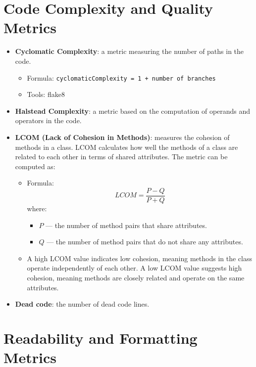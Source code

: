 \documentclass{article}
\begin{document}
\section{Code Complexity and Quality Metrics}

\begin{itemize}
    \item \textbf{Cyclomatic Complexity}: a metric measuring the number of paths in the code. 
    \begin{itemize}
        \item Formula: \texttt{cyclomaticComplexity = 1 + number of branches}
        \item Tools: flake8
    \end{itemize}
    \item \textbf{Halstead Complexity}: a metric based on the computation of operands and operators in the code.
    \item \textbf{LCOM (Lack of Cohesion in Methods)}: measures the cohesion of methods in a class. LCOM calculates how well the methods of a class are related to each other in terms of shared attributes. The metric can be computed as:
    \begin{itemize}
        \item Formula: 
        \[
        LCOM = \frac{P - Q}{P + Q}
        \]
        where:
        \begin{itemize}
            \item \( P \) — the number of method pairs that share attributes.
            \item \( Q \) — the number of method pairs that do not share any attributes.
        \end{itemize}
        \item A high LCOM value indicates low cohesion, meaning methods in the class operate independently of each other. A low LCOM value suggests high cohesion, meaning methods are closely related and operate on the same attributes.
    \end{itemize}
    \item \textbf{Dead code}: the number of dead code lines.
\end{itemize}

\section{Readability and Formatting Metrics}
\end{document}
